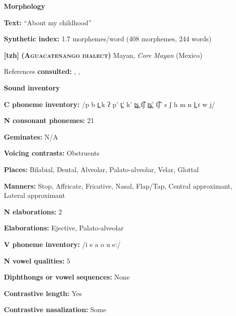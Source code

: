 \textbf{Morphology}



\textbf{Text:} “About my childhood” \citep[248-250]{Yumitani1998}



\textbf{Synthetic index:} 1.7 morphemes/word (408 morphemes, 244 words)



\textbf{[tzh]}   \textbf{\textsc{ (Aguacatenango dialect)}}  Mayan, \textit{Core} \textit{Mayan} (Mexico)



References \textbf{consulted:} \citet{Kaufman1971}, \citet{Polian2006}, \citet{Smith2007}



\textbf{Sound inventory}



\textbf{C phoneme inventory:} /p b t̪ k ʔ p’ t̪’ k’ t̪s̪ t͡ʃ t̪s̪’ t͡ʃ’ s ʃ h m n l̪ ɾ w j/



\textbf{N consonant phonemes:} 21



\textbf{Geminates:} N/A



\textbf{Voicing contrasts:} Obstruents



\textbf{Places:} Bilabial, Dental, Alveolar, Palato-alveolar, Velar, Glottal



\textbf{Manners:} Stop, Affricate, Fricative, Nasal, Flap/Tap, Central approximant, Lateral approximant



\textbf{N elaborations:} 2



\textbf{Elaborations:} Ejective, Palato-alveolar



\textbf{V phoneme inventory:} /i e a o u eː/



\textbf{N vowel qualities:} 5



\textbf{Diphthongs or vowel sequences:} None



\textbf{Contrastive length:} Yes



\textbf{Contrastive nasalization:} Some



